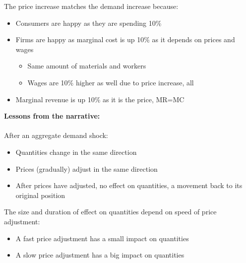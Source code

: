 \documentclass[12pt, letterpaper]{article}
\begin{document}
The price increase matches the demand increase because:
\begin{itemize}
	\item Consumers are happy as they are spending 10\%
	\item Firms are happy as marginal cost is up 10\% as it depends on prices and wages
		\begin{itemize}
			\item Same amount of materials and workers
			\item Wages are 10\% higher as well due to price increase, all
		\end{itemize}
	\item Marginal revenue is up 10\% as it is the price, MR=MC\\
\end{itemize}
\textbf{Lessons from the narrative:} \\ \\
After an aggregate demand shock:
\begin{itemize}
	\item Quantities change in the same direction
	\item Prices (gradually) adjust in the same direction
	\item After prices have adjusted, no effect on quantities, a movement back to its original position
\end{itemize}
The size and duration of effect on quantities depend on speed of price adjustment:
\begin{itemize}
	\item A fast price adjustment has a small impact on quantities
	\item A slow price adjustment has a big impact on quantities
\end{itemize}
\end{document}

